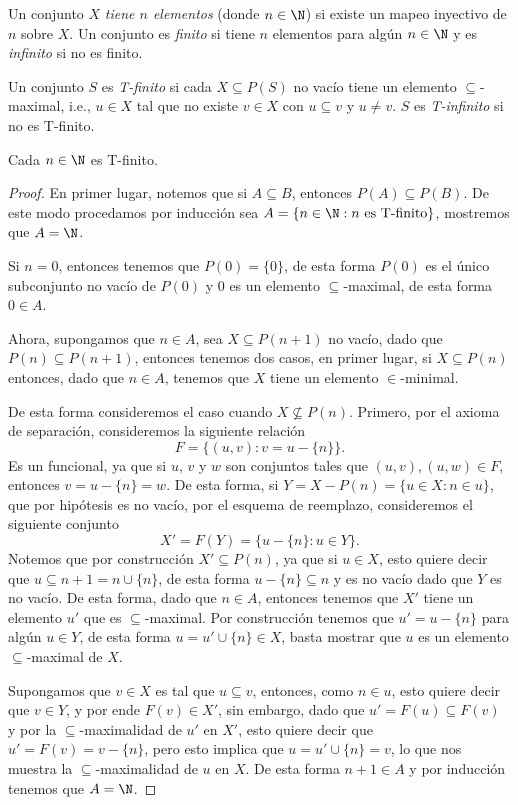 Un conjunto $X$ \emph{tiene $n$ elementos} (donde $n \in \N$) si existe un mapeo inyectivo de $n$ sobre $X$. Un conjunto es \emph{finito} si tiene $n$ elementos para algún $n \in \N$ y es \emph{infinito} si no es finito.

Un conjunto $S$ es \emph{T-finito} si cada $X \subseteq P(S)$ no vacío tiene un elemento $\subseteq$-maximal, i.e., $u \in X$ tal que no existe $v \in X$ con $u \subseteq v$ y $u \neq v$. $S$ es \emph{T-infinito} si no es T-finito.

\begin{exercise}[1.10]
  Cada $n \in \N$ es T-finito.
\end{exercise}
\begin{proof}
  En primer lugar, notemos que si $A \subseteq B$, entonces $P(A)\subseteq P(B)$. De este modo procedamos por inducción sea $A = \{n \in \N : n \ \text{es T-finito}\}$, mostremos que $A = \N$.

  Si $n = 0$, entonces tenemos que $P(0) = \{0\}$, de esta forma $P(0)$ es el único subconjunto no vacío de $P(0)$ y $0$ es un elemento $\subseteq$-maximal, de esta forma $0 \in A$.
  
  

  Ahora, supongamos que $n \in A$, sea $X \subseteq P(n+1)$ no vacío, dado que $P(n) \subseteq P(n+1)$, entonces tenemos dos casos, en primer lugar, si $X \subseteq P(n)$ entonces, dado que $n \in A$, tenemos que $X$ tiene un elemento $\in$-minimal.
  
  De esta forma consideremos el caso cuando $X \nsubseteq P(n)$. Primero, por el axioma de separación, consideremos la siguiente relación
  \[
    F = \{ (u,v) : v = u - \{n\} \}.
  \]
  Es un funcional, ya que si $u$, $v$ y $w$ son conjuntos tales que $(u,v), (u,w) \in F$, entonces $v = u - \{n\} = w$. De esta forma, si $Y = X - P(n) = \{u \in X : n \in u\}$, que por hipótesis es no vacío, por el esquema de reemplazo, consideremos el siguiente conjunto 
  \[
    X' = F(Y) = \{ u - \{n\} : u \in Y\}.
  \]
  Notemos que por construcción $X' \subseteq P(n)$, ya que si $u \in X$, esto quiere decir que $u \subseteq n+1 = n \cup \{n\}$, de esta forma $u - \{n\} \subseteq n$ y es no vacío dado que $Y$ es no vacío. De esta forma, dado que $n \in A$, entonces tenemos que $X'$ tiene un elemento $u'$ que es $\subseteq$-maximal. Por construcción tenemos que $u' = u - \{n\}$ para algún $u \in Y$, de esta forma $u = u' \cup \{n\} \in X$, basta mostrar que $u$ es un elemento $\subseteq$-maximal de $X$.

  Supongamos que $v \in X$ es tal que $u \subseteq v$, entonces, como $n \in u$, esto quiere decir que $v \in Y$, y por ende $F(v) \in X'$, sin embargo, dado que $u' = F(u) \subseteq F(v)$ y por la $\subseteq$-maximalidad de $u'$ en $X'$, esto quiere decir que $u' = F(v) = v - \{n\}$, pero esto implica que $u = u' \cup \{n\} = v$, lo que nos muestra la $\subseteq$-maximalidad de $u$ en $X$. De esta forma $n+1 \in A$ y por inducción tenemos que $A = \N$.
\end{proof}